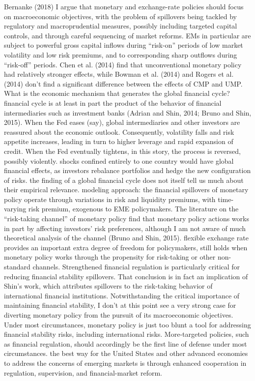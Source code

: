 Bernanke (2018)
I argue that monetary and exchange-rate policies should focus on macroeconomic objectives, with the problem of spillovers being tackled by regulatory and macroprudential measures, possibly including targeted capital controls, and through careful sequencing of market reforms. 
EMs in particular are subject to powerful gross capital inflows during “risk-on” periods of low market volatility and low risk premiums, and to corresponding sharp outflows during “risk-off” periods. 
Chen et al. (2014) find that unconventional monetary policy had relatively stronger effects, while Bowman et al. (2014) and Rogers et al. (2014) don’t find a significant difference between the effects of CMP and UMP. 
What is the economic mechanism that generates the global financial cycle? financial
cycle is at least in part the product of the behavior of financial intermediaries such as investment banks (Adrian and Shin, 2014; Bruno and Shin, 2015).
When the Fed eases (say), global intermediaries and other investors are reassured about the economic outlook. Consequently, volatility falls and risk appetite increases, leading in turn to higher leverage and rapid expansion of credit. When the Fed eventually tightens, in this story, the process is reversed, possibly violently. 
shocks confined entirely to one country would have global financial effects, as investors rebalance portfolios and hedge the new configuration of risks.
the finding of a global financial cycle does not itself tell us much about their empirical relevance. 
modeling approach: the financial spillovers of monetary policy operate through variations in risk and liquidity premiums, with time-varying risk premium, exogenous to EME policymakers.
The literature on the “risk-taking channel” of monetary policy find that monetary policy actions works in part by affecting investors’ risk preferences, although I am not aware of much theoretical analysis of the channel (Bruno and Shin, 2015). 
flexible exchange rate provides an important extra degree of freedom for policymakers, still holds when monetary policy works through the propensity for risk-taking or other non-standard channels.
Strengthened financial regulation is particularly critical for reducing financial stability
spillovers. That conclusion is in fact an implication of Shin’s work, which attributes spillovers to the risk-taking behavior of international financial institutions.
Notwithstanding the critical importance of maintaining
financial stability, I don’t at this point see a very strong case for diverting monetary policy from the pursuit of its macroeconomic objectives.
Under most circumstances, monetary policy is just too blunt a tool for addressing financial stability risks, including international risks. More-targeted policies, such as financial regulation, should accordingly be the first line of defense under most circumstances.
the best way for the United States and other advanced economies to address the concerns of emerging markets is through enhanced cooperation in regulation, supervision, and financial-market reform. 


